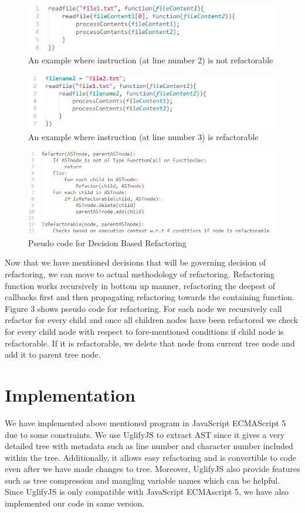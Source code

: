 \documentclass[10pt,conference]{IEEEtran}
\begin{document}
\begin{figure}[t]
	\includegraphics[scale=0.5]{not-refactorable-example.png}
	\caption{An example where instruction (at line number 2) is not refactorable}
	\label{fig}
\end{figure}

\begin{figure}[t]
	\includegraphics[scale=0.5]{refactorable-example.png}
	\caption{An example where instruction (at line number 3) is refactorable}
	\label{fig}
\end{figure}
\begin{figure}[t]
	\includegraphics[scale=0.5]{code-decision-refactor.png}
	\caption{Pseudo code for Decision Based Refactoring}
	\label{fig}
\end{figure}

Now that we have mentioned decisions that will be governing decision of refactoring, we can move to actual methodology of refactoring. Refactoring function works recursively in bottom up manner, refactoring the deepest of callbacks first and then propagating refactoring towards the containing function. Figure 3 shows pseudo code for refactoring. For each node we recursively call refactor for every child and once all children nodes have been refactored we check for every child node with respect to fore-mentioned conditions if child node is refactorable. If it is refactorable, we delete that node from current tree node and add it to parent tree node.
\section{Implementation}
We have implemented above mentioned program in JavaScript ECMAScript 5 due to some constraints. We use UglifyJS to extract AST since it gives a very detailed tree with metadata such as line number and character number included within the tree. Additionally, it allows easy refactoring and is convertible to code even after we have made changes to tree. Moreover, UglifyJS also provide features such as tree compression and mangling variable names which can be helpful. Since UglifyJS is only compatible with JavaScript ECMAscript 5, we have also implemented our code in same version.
\end{document}
